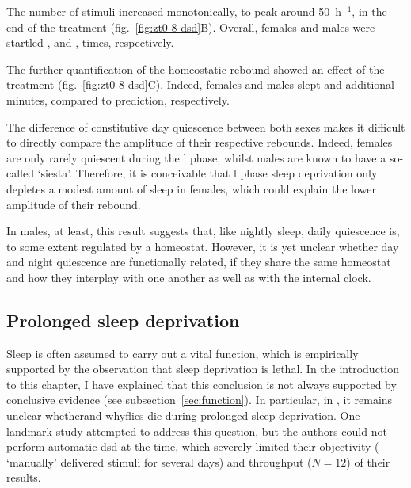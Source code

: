 The number of stimuli increased monotonically, to peak around 50~h$^{-1}$, in the end of the treatment (fig.~\ref{fig:zt0-8-dsd}B). 
Overall, females and males were startled
, and
, times,
respectively.

The further quantification of the homeostatic rebound showed an effect of the treatment (fig.~\ref{fig:zt0-8-dsd}C).
Indeed, females and males slept  and  additional minutes, compared to prediction, respectively.

The difference of constitutive day quiescence between both sexes makes it difficult to directly compare the amplitude of their respective rebounds.
Indeed, females are only rarely quiescent during the \gls{l} phase,
whilst males are known to have a so-called `siesta'.
Therefore, it is conceivable that \gls{l} phase sleep deprivation only depletes a modest amount of sleep in females, 
which could explain the lower amplitude of their rebound.

In males, at least, this result suggests that, like nightly sleep, daily quiescence is, to some extent regulated by a homeostat.
However, it is yet unclear whether day and night quiescence are functionally related, if they share the same homeostat and how they interplay with one another as well as with the internal clock.


\subsection{Prolonged sleep deprivation}


Sleep is often assumed to carry out a vital function\cite{cirelli_is_2008}, which is empirically supported by the observation that sleep deprivation is lethal\cite{shaw_stress_2002}.
In the introduction to this chapter, I have explained that this conclusion is not always supported by conclusive evidence (see subsection~\ref{sec:function}).
In particular, in \dmel, it remains unclear whether\emd{}and why\emd{}flies die during prolonged sleep deprivation.
One landmark study attempted to address this question, but the authors could not perform automatic \gls{dsd} at the time, which severely limited their objectivity (\eg{} `manually' delivered stimuli for several days) and throughput ($N=12$) of their results\cite{shaw_stress_2002}.

